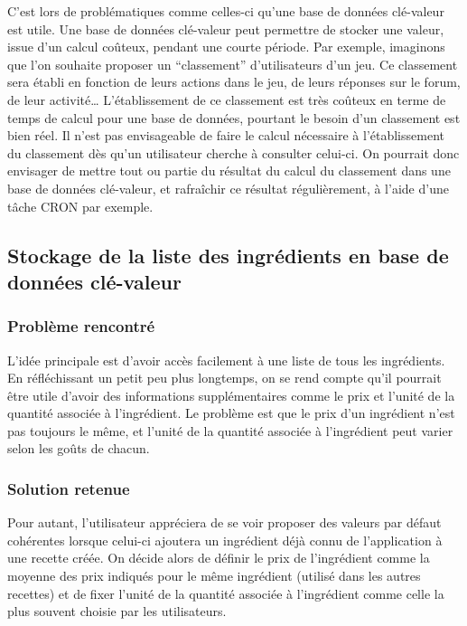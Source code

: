 		C'est lors de problématiques comme celles-ci qu'une base de données clé-valeur est utile. Une base de données clé-valeur peut permettre de stocker une valeur, issue d'un calcul coûteux, pendant une courte période. Par exemple, imaginons que l'on souhaite proposer un \enquote{classement} d'utilisateurs d'un jeu. Ce classement sera établi en fonction de leurs actions dans le jeu, de leurs réponses sur le forum, de leur activité\dots{} L'établissement de ce classement est très coûteux en terme de temps de calcul pour une base de données, pourtant le besoin d'un classement est bien réel. Il n'est pas envisageable de faire le calcul nécessaire à l'établissement du classement dès qu'un utilisateur cherche à consulter celui-ci. On pourrait donc envisager de mettre tout ou partie du résultat du calcul du classement dans une base de données clé-valeur, et rafraîchir ce résultat régulièrement, à l'aide d'une tâche CRON par exemple.

	\subsection{Stockage de la liste des ingrédients en base de données clé-valeur}
		\subsubsection{Problème rencontré}
			L'idée principale est d'avoir accès facilement à une liste de tous les ingrédients. En réfléchissant un petit peu plus longtemps, on se rend compte qu'il pourrait être utile d'avoir des informations supplémentaires comme le prix et l'unité de la quantité associée à l'ingrédient. Le problème est que le prix d'un ingrédient n'est pas toujours le même, et l'unité de la quantité associée à l'ingrédient peut varier selon les goûts de chacun.\\

		\subsubsection{Solution retenue}
			Pour autant, l'utilisateur appréciera de se voir proposer des valeurs par défaut cohérentes lorsque celui-ci ajoutera un ingrédient déjà connu de l'application à une recette créée. On décide alors de définir le prix de l'ingrédient comme la moyenne des prix indiqués pour le même ingrédient (utilisé dans les autres recettes) et de fixer l'unité de la quantité associée à l'ingrédient comme celle la plus souvent choisie par les utilisateurs.\\

